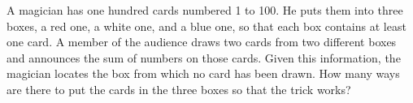 A magician has one hundred cards numbered 1 to 100. He puts them into three boxes, a red one, a white one, and a blue one, so that each box contains at least one card. A member of the audience draws two cards from two different boxes and announces the sum of numbers on those cards. Given this information, the magician locates the box from which no card has been drawn. How many ways are there to put the cards in the three boxes so that the trick works?
